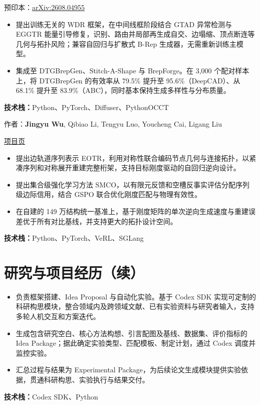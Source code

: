 \documentclass[11pt,a4paper]{article}
\begin{document}
预印本：\href{https://arxiv.org/abs/2608.04955}{arXiv:2608.04955}
\begin{itemize}
\item 提出训练无关的 WDR 框架，在中间线框阶段结合 GTAD 异常检测与 EGGTR 能量引导修复，识别、路由并局部再生成自交、边塌缩、顶点断连等几何与拓扑风险；兼容自回归与扩散式 B-Rep 生成器，无需重新训练主模型。
\item 集成至 DTGBrepGen、Stitch-A-Shape 与 BrepForge。在 3,000 个配对样本上，将 DTGBrepGen 的有效率从 79.5\% 提升至 95.6\%（DeepCAD）、从 68.1\% 提升至 83.9\%（ABC），同时基本保持生成多样性与分布质量。
\end{itemize}
\textbf{技术栈：}Python、PyTorch、Diffuser、PythonOCCT

作者：\textbf{Jingyu Wu}, Qibiao Li, Tengyu Luo, Youcheng Cai, Ligang Liu

\href{https://spaceboy202105.github.io/andyng2002.github.io/trussorbit/}{项目页}
\begin{itemize}
\item 提出边轨道序列表示 EOTR，利用对称性联合编码节点几何与连接拓扑，以紧凑序列和对称展开重建完整桁架，支持目标刚度驱动的自回归逆向设计。
\item 提出集合级强化学习方法 SMCO，以有限元反馈和空槽反事实评估分配序列级边际信用，结合 GSPO 联合优化刚度匹配与物理有效性。
\item 在自建的 149 万结构统一基准上，基于刚度矩阵的单次逆向生成速度与重建误差优于所有对比基线，并支持更大的拓扑设计空间。
\end{itemize}
\textbf{技术栈：}Python、PyTorch、VeRL、SGLang

\newpage
\section{研究与项目经历（续）}
\begin{itemize}
\item 负责框架搭建、Idea Proposal 与自动化实验。基于 Codex SDK 实现可定制的科研构思模块，整合领域内及跨领域文献、已有实验资料与研究者输入，支持多轮人机交互和方案迭代。
\item 生成包含研究空白、核心方法构想、引言配图及基线、数据集、评价指标的 Idea Package；据此确定实验类型、匹配模板、制定计划，通过 Codex 调度并监控实验。
\item 汇总过程与结果为 Experimental Package，为后续论文生成模块提供实验依据，贯通科研构思、实验执行与结果交付。
\end{itemize}
\textbf{技术栈：}Codex SDK、Python
\end{document}
